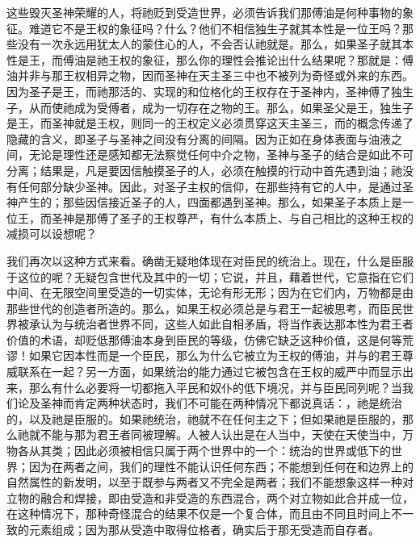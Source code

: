这些毁灭圣神荣耀的人，将祂贬到受造世界，必须告诉我们那傅油是何种事物的象征。难道它不是王权的象征吗？什么？他们不相信独生子就其本性是一位王吗？那些没有一次永远用犹太人的蒙住心的人，不会否认祂就是。\newline{}那么，如果圣子就其本性是王，而傅油是祂王权的象征，那么你的理性会推论出什么结果呢？那就是：傅油并非与那王权相异之物，因而圣神在天主圣三中也不被列为奇怪或外来的东西。因为圣子是王，而祂那活的、实现的和位格化的王权存在于圣神内，圣神傅了独生子，从而使祂成为受傅者，成为一切存在之物的王。\newline{}那么，如果圣父是王，独生子是王，而圣神就是王权，则同一的王权定义必须贯穿这天主圣三，而的概念传递了隐藏的含义，即圣子与圣神之间没有分离的间隔。\newline{}因为正如在身体表面与油液之间，无论是理性还是感知都无法察觉任何中介之物，圣神与圣子的结合是如此不可分离；结果是，凡是要因信触摸圣子的人，必须在触摸的行动中首先遇到油；祂没有任何部分缺少圣神。\newline{}因此，对圣子主权的信仰，在那些持有它的人中，是通过圣神产生的；那些因信接近圣子的人，四面都遇到圣神。那么，如果圣子本质上是一位王，而圣神是那傅了圣子的王权尊严，有什么本质上、与自己相比的这种王权的减损可以设想呢？\par

我们再次以这种方式来看。确凿无疑地体现在对臣民的统治上。现在，什么是臣服于这位的呢？无疑包含世代及其中的一切；它说，并且，藉着世代，它意指在它们中间、在无限空间里受造的一切实体，无论有形无形；因为在它们内，万物都是由那些世代的创造者所造的。那么，如果王权必须总是与君王一起被思考，而臣民世界被承认为与统治者世界不同，这些人如此自相矛盾，将当作表达那本性为君王者价值的术语，却贬低那傅油本身到臣民的等级，仿佛它缺乏这种价值，这是何等荒谬！如果它因本性而是一个臣民，那么为什么它被立为王权的傅油，并与的君王尊威联系在一起？另一方面，如果统治的能力通过它被包含在王权的威严中而显示出来，那么有什么必要将一切都拖入平民和奴仆的低下境况，并与臣民同列呢？当我们论及圣神而肯定两种状态时，我们不可能在两种情况下都说真话：，祂是统治的，以及祂是臣服的。如果祂统治，祂就不在任何主之下；但如果祂是臣服的，那么祂就不能与那为君王者同被理解。人被人认出是在人当中，天使在天使当中，万物各从其类；因此必须被相信只属于两个世界中的一个：统治的世界或低下的世界；因为在两者之间，我们的理性不能认识任何东西；不能想到任何在和边界上的自然属性的新发明，以至于既参与两者又不完全是两者；我们不能想象这样一种对立物的融合和焊接，即由受造和非受造的东西混合，两个对立物如此合并成一位，在这种情况下，那种奇怪混合的结果不仅是一个复合体，而且由不同且时间上不一致的元素组成；因为那从受造中取得位格者，确实后于那无受造而自存者。\par

